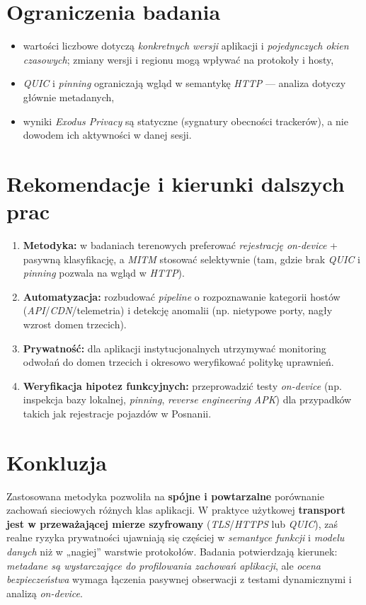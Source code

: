 \section{Ograniczenia badania}

\begin{itemize}
  \item wartości liczbowe dotyczą \emph{konkretnych wersji} aplikacji i \emph{pojedynczych okien czasowych}; zmiany wersji i regionu mogą wpływać na protokoły i hosty,
  \item \emph{QUIC} i \emph{pinning} ograniczają wgląd w semantykę \emph{HTTP} — analiza dotyczy głównie metadanych,
  \item wyniki \emph{Exodus Privacy} są statyczne (sygnatury obecności trackerów), a nie dowodem ich aktywności w danej sesji.
\end{itemize}

\section{Rekomendacje i kierunki dalszych prac}

\begin{enumerate}
  \item \textbf{Metodyka:} w badaniach terenowych preferować \emph{rejestrację on-device} + pasywną klasyfikację, a \emph{MITM} stosować selektywnie (tam, gdzie brak \emph{QUIC} i \emph{pinning} pozwala na wgląd w \emph{HTTP}).
  \item \textbf{Automatyzacja:} rozbudować \emph{pipeline} o rozpoznawanie kategorii hostów (\emph{API}/\emph{CDN}/telemetria) i detekcję anomalii (np. nietypowe porty, nagły wzrost domen trzecich).
  \item \textbf{Prywatność:} dla aplikacji instytucjonalnych utrzymywać monitoring odwołań do domen trzecich i okresowo weryfikować politykę uprawnień.
  \item \textbf{Weryfikacja hipotez funkcyjnych:} przeprowadzić testy \emph{on-device} (np. inspekcja bazy lokalnej, \emph{pinning}, \emph{reverse engineering} \emph{APK}) dla przypadków takich jak rejestracje pojazdów w Posnanii.
\end{enumerate}

\section{Konkluzja}

Zastosowana metodyka pozwoliła na \textbf{spójne i powtarzalne} porównanie zachowań sieciowych różnych klas aplikacji. W praktyce użytkowej \textbf{transport jest w przeważającej mierze szyfrowany} (\emph{TLS}/\emph{HTTPS} lub \emph{QUIC}), zaś realne ryzyka prywatności ujawniają się częściej w \emph{semantyce funkcji} i \emph{modelu danych} niż w „nagiej” warstwie protokołów. Badania potwierdzają kierunek: \textit{metadane są wystarczające do profilowania zachowań aplikacji}, ale \textit{ocena bezpieczeństwa} wymaga łączenia pasywnej obserwacji z testami dynamicznymi i analizą \emph{on-device}.

